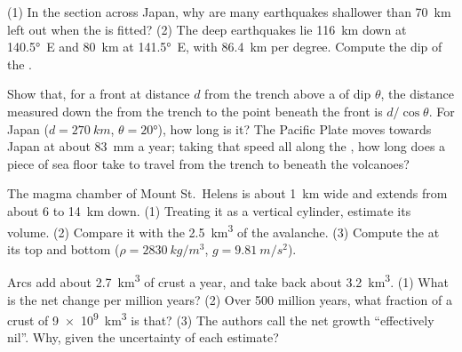 \begin{exercise}[$\star\star$]\label{exo:g12:subduction-magmatism:11}
(1) In the section across Japan, why are many earthquakes shallower than
\qty{70}{km} left out when the  is fitted? (2) The deep earthquakes lie
\qty{116}{km} down at \ang{140.5}~E and \qty{80}{km} at \ang{141.5}~E, with
\qty{86.4}{km} per degree. Compute the dip of the .
\end{exercise}

\begin{exercise}[$\star\star\star$]\label{exo:g12:subduction-magmatism:12}
Show that, for a front at distance $d$ from the trench above a  of dip
$\theta$, the distance measured down the  from the trench to the point
beneath the front is $d/\cos\theta$. For Japan ($d = \qty{270}{km}$,
$\theta = \ang{20}$), how long is it? The Pacific Plate moves towards
Japan at about \qty{83}{mm} a year; taking that speed all along the , how
long does a piece of sea floor take to travel from the trench to beneath the
volcanoes?
\end{exercise}

\begin{exercise}[$\star\star\star$]\label{exo:g12:subduction-magmatism:13}
The magma chamber of Mount St.~Helens is about \qty{1}{km} wide and extends
from about 6 to \qty{14}{km} down. (1) Treating it as a vertical cylinder,
estimate its volume. (2) Compare it with the \qty{2.5}{km^3} of the avalanche.
(3) Compute the  at its top and bottom ($\rho =
\qty{2830}{kg/m^3}$, $g = \qty{9.81}{m/s^2}$).
\end{exercise}

\begin{exercise}[$\star\star\star$]\label{exo:g12:subduction-magmatism:14}
Arcs add about \qty{2.7}{km^3} of crust a year, and  take
back about \qty{3.2}{km^3}. (1) What is the net change per million years?
(2) Over 500 million years, what fraction of a crust of \qty{9e9}{km^3} is
that? (3) The authors call the net growth ``effectively nil''. Why, given
the uncertainty of each estimate?
\end{exercise}


